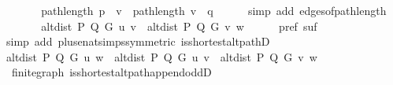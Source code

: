 \begin{isabellebody}
\ \ \isamarkupfalse%
\ \isamarkupfalse%
\ {\isachardoublequoteopen}{\isachardot}{\kern0pt}{\isachardot}{\kern0pt}{\isachardot}{\kern0pt}\ {\isacharequal}{\kern0pt}\ path{\isacharunderscore}{\kern0pt}length\ {\isacharparenleft}{\kern0pt}p\ {\isacharat}{\kern0pt}\ {\isacharbrackleft}{\kern0pt}v{\isacharbrackright}{\kern0pt}{\isacharparenright}{\kern0pt}\ {\isacharplus}{\kern0pt}\ path{\isacharunderscore}{\kern0pt}length\ {\isacharparenleft}{\kern0pt}v\ {\isacharhash}{\kern0pt}\ q{\isacharparenright}{\kern0pt}{\isachardoublequoteclose}\isanewline
\ \ \ \ \isamarkupfalse%
\ {\isacharparenleft}{\kern0pt}simp\ add{\isacharcolon}{\kern0pt}\ edges{\isacharunderscore}{\kern0pt}of{\isacharunderscore}{\kern0pt}path{\isacharunderscore}{\kern0pt}length{\isacharparenright}{\kern0pt}\isanewline
\ \ \isamarkupfalse%
\ \isamarkupfalse%
\ {\isachardoublequoteopen}{\isachardot}{\kern0pt}{\isachardot}{\kern0pt}{\isachardot}{\kern0pt}\ {\isacharequal}{\kern0pt}\ alt{\isacharunderscore}{\kern0pt}dist\ P\ Q\ G\ u\ v\ {\isacharplus}{\kern0pt}\ alt{\isacharunderscore}{\kern0pt}dist\ P\ Q\ G\ v\ w{\isachardoublequoteclose}\isanewline
\ \ \ \ \isamarkupfalse%
\ pref\ suf\isanewline
\ \ \ \ \isamarkupfalse%
\ {\isacharparenleft}{\kern0pt}simp\ add{\isacharcolon}{\kern0pt}\ plus{\isacharunderscore}{\kern0pt}enat{\isacharunderscore}{\kern0pt}simps{\isacharparenleft}{\kern0pt}{}{\isacharparenright}{\kern0pt}{\isacharbrackleft}{\kern0pt}symmetric{\isacharbrackright}{\kern0pt}\ is{\isacharunderscore}{\kern0pt}shortest{\isacharunderscore}{\kern0pt}alt{\isacharunderscore}{\kern0pt}pathD{\isacharparenleft}{\kern0pt}{}{\isacharparenright}{\kern0pt}{\isacharparenright}{\kern0pt}\isanewline
\ \ \isamarkupfalse%
\ \isamarkupfalse%
\ {\isachardoublequoteopen}alt{\isacharunderscore}{\kern0pt}dist\ P\ Q\ G\ u\ w\ {\isacharequal}{\kern0pt}\ alt{\isacharunderscore}{\kern0pt}dist\ P\ Q\ G\ u\ v\ {\isacharplus}{\kern0pt}\ alt{\isacharunderscore}{\kern0pt}dist\ P\ Q\ G\ v\ w{\isachardoublequoteclose}\isanewline
\ \ \ \ \isacommand{{\isachardot}{\kern0pt}}\isamarkupfalse%
\isanewline
{}\isamarkupfalse%
%
\endisatagproof
{\isafoldproof}%
%
\isadelimproof
\isanewline
%
\endisadelimproof
%
\isadeliminvisible
\isanewline
%
\endisadeliminvisible
%
\isataginvisible
{}\isamarkupfalse%
\ {\isacharparenleft}{\kern0pt}\ finite{\isacharunderscore}{\kern0pt}graph{\isacharparenright}{\kern0pt}\ is{\isacharunderscore}{\kern0pt}shortest{\isacharunderscore}{\kern0pt}alt{\isacharunderscore}{\kern0pt}path{\isacharunderscore}{\kern0pt}append{\isacharunderscore}{\kern0pt}oddD{\isacharcolon}{\kern0pt}\isanewline

\end{isabellebody}
